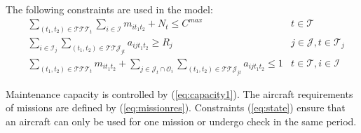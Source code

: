 \documentclass[a4paper,onecolumn,fleqn]{article}
\begin{document}
    The following constraints are used in the model:
    \begin{align}
        & \sum_{(t_1, t_2) \in \mathcal{T}\mathcal{T}\mathcal{T}_{t}} \sum_{i \in \mathcal{I}} m_{it_1t_2} + N_t \leq C^{max}
          & t \in \mathcal{T} \label{eq:capacity1}\\
        & \sum_{i \in \mathcal{I}_j} \sum_{(t_1, t_2) \in \mathcal{T}\mathcal{T}\mathcal{J}_{jt}} a_{ijt_1t_2} \geq R_j
                & j \in \mathcal{J}, t \in \mathcal{T}_j  \label{eq:missionres}\\
        & \sum_{(t_1, t_2) \in \mathcal{T}\mathcal{T}\mathcal{T}_{t}} m_{it_1t_2} + \sum_{j \in \mathcal{J}_t \cap \mathcal{O}_i} \sum_{(t_1, t_2) \in \mathcal{T}\mathcal{T}\mathcal{J}_{jt}} a_{ijt_1t_2} \leq 1 
                & t \in \mathcal{T}, i \in \mathcal{I} \label{eq:state}
    \end{align}

    Maintenance capacity is controlled by (\ref{eq:capacity1}). The aircraft requirements of missions are defined by (\ref{eq:missionres}). Constraints (\ref{eq:state}) ensure that an aircraft can only be used for one mission or undergo check in the same period.


\end{document}
